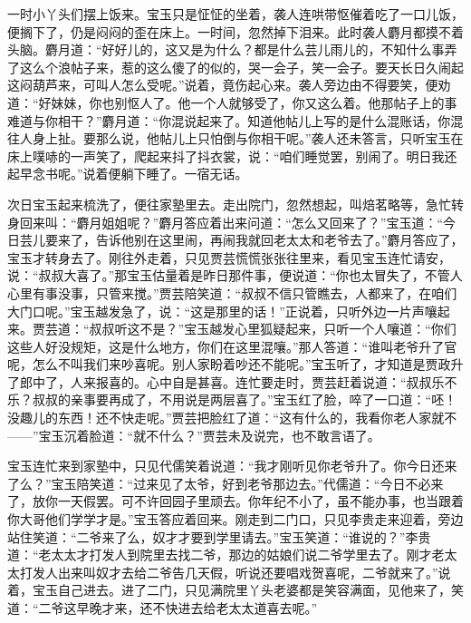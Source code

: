 \begin{parag}
    一时小丫头们摆上饭来。宝玉只是怔怔的坐着，袭人连哄带怄催着吃了一口儿饭，便搁下了，仍是闷闷的歪在床上。一时间，忽然掉下泪来。此时袭人麝月都摸不着头脑。麝月道：“好好儿的，这又是为什么？都是什么芸儿雨儿的，不知什么事弄了这么个浪帖子来，惹的这么傻了的似的，哭一会子，笑一会子。要天长日久闹起这闷葫芦来，可叫人怎么受呢。”说着，竟伤起心来。袭人旁边由不得要笑，便劝道：“好妹妹，你也别怄人了。他一个人就够受了，你又这么着。他那帖子上的事难道与你相干？”麝月道：“你混说起来了。知道他帖儿上写的是什么混账话，你混往人身上扯。要那么说，他帖儿上只怕倒与你相干呢。”袭人还未答言，只听宝玉在床上噗哧的一声笑了，爬起来抖了抖衣裳，说：“咱们睡觉罢，别闹了。明日我还起早念书呢。”说着便躺下睡了。一宿无话。
\end{parag}


\begin{parag}
    次日宝玉起来梳洗了，便往家塾里去。走出院门，忽然想起，叫焙茗略等，急忙转身回来叫：“麝月姐姐呢？”麝月答应着出来问道：“怎么又回来了？”宝玉道：“今日芸儿要来了，告诉他别在这里闹，再闹我就回老太太和老爷去了。”麝月答应了，宝玉才转身去了。刚往外走着，只见贾芸慌慌张张往里来，看见宝玉连忙请安，说：“叔叔大喜了。”那宝玉估量着是昨日那件事，便说道：“你也太冒失了，不管人心里有事没事，只管来搅。”贾芸陪笑道：“叔叔不信只管瞧去，人都来了，在咱们大门口呢。”宝玉越发急了，说：“这是那里的话！”正说着，只听外边一片声嚷起来。贾芸道：“叔叔听这不是？”宝玉越发心里狐疑起来，只听一个人嚷道：“你们这些人好没规矩，这是什么地方，你们在这里混嚷。”那人答道：“谁叫老爷升了官呢，怎么不叫我们来吵喜呢。别人家盼着吵还不能呢。”宝玉听了，才知道是贾政升了郎中了，人来报喜的。心中自是甚喜。连忙要走时，贾芸赶着说道：“叔叔乐不乐？叔叔的亲事要再成了，不用说是两层喜了。”宝玉红了脸，啐了一口道：“呸！没趣儿的东西！还不快走呢。”贾芸把脸红了道：“这有什么的，我看你老人家就不——”宝玉沉着脸道：“就不什么？”贾芸未及说完，也不敢言语了。
\end{parag}


\begin{parag}
    宝玉连忙来到家塾中，只见代儒笑着说道：“我才刚听见你老爷升了。你今日还来了么？”宝玉陪笑道：“过来见了太爷，好到老爷那边去。”代儒道：“今日不必来了，放你一天假罢。可不许回园子里顽去。你年纪不小了，虽不能办事，也当跟着你大哥他们学学才是。”宝玉答应着回来。刚走到二门口，只见李贵走来迎着，旁边站住笑道：“二爷来了么，奴才才要到学里请去。”宝玉笑道：“谁说的？”李贵道：“老太太才打发人到院里去找二爷，那边的姑娘们说二爷学里去了。刚才老太太打发人出来叫奴才去给二爷告几天假，听说还要唱戏贺喜呢，二爷就来了。”说着，宝玉自己进去。进了二门，只见满院里丫头老婆都是笑容满面，见他来了，笑道：“二爷这早晚才来，还不快进去给老太太道喜去呢。”
\end{parag}


